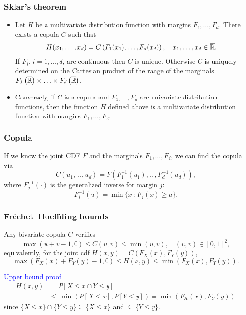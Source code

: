 \documentclass[aspectratio=169]{beamer}
\begin{document}
\begin{frame}
\frametitle{Sklar's theorem}

\begin{theorem}
	\begin{itemize}
		\item 
	Let $H$ be a multivariate distribution function with margins $F_1,\ldots, F_d$.
	There exists a copula $C$ such that
$$
		H(x_1, \ldots, x_d) = C \left( F_1(x_1), \ldots, F_d(x_d) \right), \quad x_1, \ldots, x_d \in \overline{{\mathbb{R}}}.
$$
	If $F_i$, $i = 1, \ldots, d$, are continuous then $C$ is unique. Otherwise $C$ is uniquely determined on the Cartesian product of the range of the marginals $F_1 \left( \overline{{\mathbb{R}}} \right) \times \ldots \times F_d \left( \overline{{\mathbb{R}}} \right)$.
	\item
	Conversely, if $C$ is a copula and $F_1, \ldots, F_d$ are univariate distribution functions, then the function $H$ defined above is a multivariate distribution function with margins $F_1, \ldots, F_d$.
	\end{itemize}
\end{theorem}

\end{frame}

\begin{frame}
\frametitle{Copula}

If we know the joint CDF $F$ and the marginals $F_1,\ldots,F_d$, we can find the copula via
$$
C(u_1,\ldots,u_d) = F\left(F_1^{-1}(u_1),\ldots,F_d^{-1}(u_d)\right),
$$
where $F_j^{-1}(\cdot)$ is the generalized inverse for margin $j$:
$$
F_j^{-1}(u) = \min \{ x \,:\, F_j(x) \geq u \}.
$$

\end{frame}

\begin{frame}
\frametitle{Fréchet–Hoeffding bounds}

Any bivariate copula $C$ verifies
$$
\max(u + v - 1, 0) \leq C(u, v) \leq \min(u, v), \quad (u,v) \in [0,1]^2,
$$
equivalently, for the joint cdf $H(x,y) = C(F_X(x), F_Y(y))$,
$$
\max(F_X(x) + F_Y(y) - 1, 0) \leq H(x, y) \leq \min(F_X(x), F_Y(y)).
$$

\mbox{}

\textcolor{blue}{Upper bound proof}
	\begin{align*}
		H(x, y) &= P[X \leq x \cap Y \leq y] \\
		&\leq \min\left(P[X \leq x], P[Y \leq y]\right) = \min(F_X(x), F_Y(y))
	\end{align*}
	since $\lbrace X \leq x \rbrace \cap \lbrace Y \leq y \rbrace \subseteq \lbrace X \leq x \rbrace$ and $\subseteq \lbrace Y \leq y \rbrace$.

\end{frame}
\end{document}
